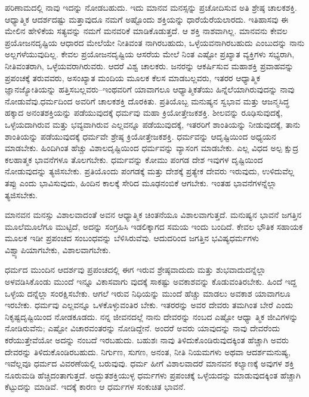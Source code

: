 ಪರಿಣಾಮದಲ್ಲಿ ನಾವು ಇದನ್ನು ನೋಡಬಹುದು. ಇದು ಮಾನವ ಮನಸ್ಸನ್ನು ಪ್ರಚೋದಿಸುವ ಅತಿ ಶ್ರೇಷ್ಠ ಚಾಲಕಶಕ್ತಿ. ಆಧ್ಯಾತ್ಮಿಕ ಆದರ್ಶದಷ್ಟು ಮತ್ತಾವುದೂ ನಮಗೆ ಅಷ್ಟೊಂದು ಶಕ್ತಿಯನ್ನು ಧಾರೆಯೆರೆಯಲಾರದು. ಇತಿಹಾಸವು ಈ ಮೇಲಿನ ಹೇಳಿಕೆಯ ಸತ್ಯವನ್ನು ನಮಗೆ ಮನವರಿಕೆ ಮಾಡಿಕೊಡುತ್ತದೆ. ಆ ಶಕ್ತಿ ನಾಶವಾಗಿಲ್ಲ. ಮಾನವನು ಕೇವಲ ಪ್ರಯೋಜನದೃಷ್ಟಿಯ ಆಧಾರದ ಮೇಲೆಯೇ ನೀತಿವಂತ ನಾಗಿರಬಹುದು, ಒಳ್ಳೆಯವನಾಗಿರಬಹುದು ಎಂಬುದನ್ನು ನಾನು ಅಲ್ಲಗಳೆಯುವುದಿಲ್ಲ. ಕೇವಲ ಪ್ರಯೋಜನದೃಷ್ಟಿಯ ಆಸರೆಯ ಮೇಲೆ ನಿಂತ ಎಷ್ಟೋ ಪ್ರಖ್ಯಾತ ವ್ಯಕ್ತಿಗಳು ಸಭ್ಯರಾಗಿ, ನೀತಿವಂತರಾಗಿ, ಒಳ್ಳೆಯವರಾಗಿರುವರು. ಆದರೆ ವಿಶ್ವ ಚಾಲಕರು. ಜನರನ್ನು ಆಕರ್ಷಿಸುವ ಮಹಾಶಕ್ತಿ ಪ್ರವಾಹವನ್ನು ಪ್ರಪಂಚಕ್ಕೆ ತರುವವರು, ಅಸಂಖ್ಯಾತ ಮಂದಿಯ ಮೂಲಕ ಕೆಲಸ ಮಾಡಬಲ್ಲವರು, ಇತರರ ಆಧ್ಯಾತ್ಮಿಕ ಜ್ಞಾನಜ್ಯೋತಿಯನ್ನು ಹತ್ತಿಸಬಲ್ಲವರು–ಇಂಥವರಿಗೆ ಯಾವಾಗಲೂ ಆಧ್ಯಾತ್ಮಿಕತೆಯು ಹಿನ್ನೆಲೆಯಾಗಿರುವುದನ್ನು ನಾವು ನೋಡುವೆವು.ಧರ್ಮದಿಂದ ಅವರಿಗೆ ಚಾಲಕಶಕ್ತಿ ದೊರಕಿತು. ಪ್ರತಿಯೊಬ್ಬ ಮನುಷ್ಯನ ಸ್ವಭಾವ ಮತ್ತು ಆಜನ್ಮಸಿದ್ಧ ಹಕ್ಕಾದ ಅನಂತಶಕ್ತಿಯನ್ನು ಪಡೆಯುವುದಕ್ಕೆ ಧರ್ಮವು ಮಹಾ ಕ್ರಿಯೋತ್ತೇಜಕಶಕ್ತಿ. ಶೀಲವನ್ನು ರೂಢಿಸುವುದಕ್ಕೆ, ಒಳ್ಳೆಯದಾಗಿರುವ ಮತ್ತು ಭವ್ಯವಾಗಿರುವ ಎಲ್ಲವನ್ನೂ ಪಡೆಯುವುದಕ್ಕೆ, ಇತರರಿಗೆ ಶಾಂತಿಯನ್ನು ನೀಡುವುದಕ್ಕೆ, ತಾನು ಶಾಂತಿಯನ್ನು ಪಡೆಯುವುದಕ್ಕೆ ಧರ್ಮವೇ ಶ್ರೇಷ್ಠ ಕ್ರಿಯೋತ್ತೇಜಕಶಕ್ತಿ. ಧರ್ಮವನ್ನು ಆದೃಷ್ಟಿಯಿಂದ ಅಧ್ಯಯನ ಮಾಡಬೇಕು. ಹಿಂದಿಗಿಂತ ಹೆಚ್ಚು ವಿಶಾಲದೃಷ್ಟಿಯಿಂದ ಧರ್ಮವನ್ನು ವ್ಯಾಸಂಗ ಮಾಡಬೇಕು. ಎಲ್ಲ ವಿಧದ ಅಲ್ಪ ಕ್ಷುದ್ರ ಕಲಹಾತ್ಮಕ ಭಾವನೆಗಳೂ ತೊಲಗಬೇಕು. ಧರ್ಮವನ್ನು ಕೋಮು ಪಂಗಡ ದೇಶ ಇವುಗಳ ದೃಷ್ಟಿಯಿಂದ ನೋಡುವುದನ್ನು ತ್ಯಜಿಸಬೇಕು. ಪ್ರತಿಯೊಂದು ಪಂಗಡಕ್ಕೆ ಮತ್ತು ದೇಶಕ್ಕೆ ಪ್ರತ್ಯೇಕ ದೇವರು ಇರುವುದು, ಉಳಿದುವೆಲ್ಲ ತಪ್ಪು ಎಂದು ಭಾವಿಸುವುದು, ಹಿಂದಿನ ಕಾಲಕ್ಕೆ ಸೇರಿದ ಮೂಢನಂಬಿಕೆ ಆಗಬೇಕು. ಇಂತಹ ಭಾವನೆಗಳನ್ನೆಲ್ಲಾ ತ್ಯಜಿಸಬೇಕು.

ಮಾನವನ ಮನಸ್ಸು ವಿಶಾಲವಾದಂತೆ ಅವನ ಆಧ್ಯಾತ್ಮಿಕ ಚಿಂತನೆಯೂ ವಿಶಾಲವಾಗುತ್ತದೆ. ಮನುಷ್ಯನ ಭಾವನೆ ಜಗತ್ತಿನ ಮೂಲೆಮೂಲೆಗೂ ಮುಟ್ಟಿದೆ, ಅದನ್ನು ಸಂಗ್ರಹಿಸಿ ಇಡಲಿಕ್ಕಾಗದ ಸಮಯ ಇಂದು ಬಂದಿದೆ. ಕೇವಲ ಭೌತಿಕ ಸಹಾಯಕ ಮೂಲಕ ಇಡೀ ಪ್ರಪಂಚದ ಸಂಬಂಧವನ್ನು ಬೆಳಿಸಿರುವೆವು. ಆದುದರಿಂದ ಜಗತ್ತಿನ ಭವಿಷ್ಯಧರ್ಮಗಳು ವಿಶ್ವ್ಯಾಪಿಯಾಗಬೇಕು, ವಿಶಾಲವಾಗಬೇಕು.

ಧರ್ಮದ ಮುಂದಿನ ಆದರ್ಶವು ಪ್ರಪಂಚದಲ್ಲಿ ಈಗ ಇರುವ ಶ್ರೇಷ್ಠವಾದುದು ಮತ್ತು ಶುಭವಾದುದನ್ನೆಲ್ಲಾ ಅಳವಡಿಸಿಕೊಂಡು ಮುಂದೆ ಇನ್ನೂ ವಿಕಾಸವಾಗು ವುದಕ್ಕೆ ಸಾಕಷ್ಟು ಅವಕಾಶವನ್ನು ಕೊಡುವಂತಿರಬೇಕು. ಹಿಂದೆ ಇದ್ದ ಒಳ್ಳೆಯ ದನ್ನೆಲ್ಲಾ ಸಂರಕ್ಷಿಸಬೇಕು. ಆಗಲೆ ಇರುವ ನಿಧಿಯನ್ನು ಮುಂದೆ ಹೆಚ್ಚು ಮಾಡಲು ಅವಕಾಶ ಯಾವಾಗಲೂ ಇರಬೇಕು. ಧರ್ಮವು ಎಲ್ಲವನ್ನೂ ಒಳಕೊಳ್ಳುವಂತಿರ ಬೇಕು. ಇತರರನ್ನು ಅವರ ದೇವರು ತಮಗಿಂತ ಬೇರೆ ಎಂದು ನಿಕೃಷ್ಟದೃಷ್ಟಿಯಿಂದ ನೋಡಕೂಡದು. ನನ್ನ ಜೀವನದಲ್ಲೆ ನಾನು ದೇವರನ್ನು ನಂಬದ ಎಷ್ಟೋ ಆಧ್ಯಾ ತ್ಮಿಕ ಜೀವಿಗಳನ್ನು ನೋಡಿರುವೆನು; ಎಷ್ಟೋ ವಿಚಾರವಂತರನ್ನು ನೋಡಿದ್ದೇನೆ. ಅಂದರೆ ಅವರು ಯಾವುದನ್ನು ನಾವು ದೇವರೆಂದು ಕರೆಯುತ್ತೇವೆಯೋ ಅದನ್ನು ನಂಬದೆ ಇರಬಹುದು. ಬಹುಶಃ ನಾವು ತಿಳಿದುಕೊಂಡಿರುವುದಕ್ಕಿಂತ ಹೆಚ್ಚಾಗಿ ಅವರು ದೇವರನ್ನು ತಿಳಿದುಕೊಂಡಿರಬಹುದು. ನಿರ್ಗುಣ, ಸುಗಣ, ಅನಂತ, ನೀತಿ ನಿಯಮಗಳು ಅಥವಾ ಆದರ್ಶಮನುಷ್ಯ, ಇವೆಲ್ಲವೂ ಧರ್ಮದ ವಿವರಣೆಯಲ್ಲಿ ಬರುವುವು. ಧರ್ಮ ಹೀಗೆ ವಿಶಾಲವಾದರೆ ಮಾನವನ ಕಲ್ಯಾಣಕ್ಕೆ ಅವುಗಳ ಶಕ್ತಿ ನೂರುಮಡಿ ಹೆಚ್ಚಿದಂತಾಗುತ್ತದೆ. ಅದ್ಭುತಶಕ್ತಿಯುಳ್ಳ ಧರ್ಮಗಳು ಪ್ರಪಂಚಕ್ಕೆ ಒಳ್ಳೆಯದನ್ನು ಮಾಡುವುದಕ್ಕಿಂತ ಹೆಚ್ಚಾಗಿ ಕೆಟ್ಟುದನ್ನು ಮಾಡಿವೆ. ಇದಕ್ಕೆ ಕಾರಣ ಆ ಧರ್ಮಗಳ ಸಂಕುಚಿತ ಭಾವನೆ.

